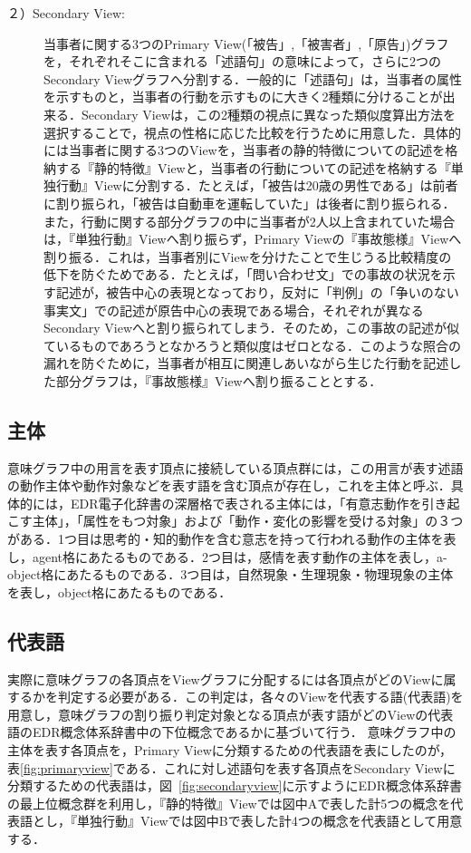 \begin{description}
\item[２）Secondary View:]当事者に関する3つのPrimary View(「被告」,「被害者」,「原告」)グラフを，それぞれそこに含まれる「述語句」の意味によって，さらに2つのSecondary Viewグラフへ分割する．一般的に「述語句」は，当事者の属性を示すものと，当事者の行動を示すものに大きく2種類に分けることが出来る．Secondary Viewは，この2種類の視点に異なった類似度算出方法を選択することで，視点の性格に応じた比較を行うために用意した．具体的には当事者に関する3つのViewを，当事者の静的特徴についての記述を格納する『静的特徴』Viewと，当事者の行動についての記述を格納する『単独行動』Viewに分割する．たとえば，「被告は20歳の男性である」は前者に割り振られ，「被告は自動車を運転していた」は後者に割り振られる．また，行動に関する部分グラフの中に当事者が2人以上含まれていた場合は，『単独行動』Viewへ割り振らず，Primary Viewの『事故態様』Viewへ割り振る．これは，当事者別にViewを分けたことで生じうる比較精度の低下を防ぐためである．たとえば，「問い合わせ文」での事故の状況を示す記述が，被告中心の表現となっており，反対に「判例」の「争いのない事実文」での記述が原告中心の表現である場合，それぞれが異なるSecondary Viewへと割り振られてしまう．そのため，この事故の記述が似ているものであろうとなかろうと類似度はゼロとなる．このような照合の漏れを防ぐために，当事者が相互に関連しあいながら生じた行動を記述した部分グラフは，『事故態様』Viewへ割り振ることとする．
\end{description}

\subsection{主体}
意味グラフ中の用言を表す頂点に接続している頂点群には，この用言が表す述語の動作主体や動作対象などを表す語を含む頂点が存在し，これを主体と呼ぶ．具体的には，EDR電子化辞書の深層格で表される主体には，「有意志動作を引き起こす主体」，「属性をもつ対象」および「動作・変化の影響を受ける対象」の３つがある．1つ目は思考的・知的動作を含む意志を持って行われる動作の主体を表し，agent格にあたるものである．2つ目は，感情を表す動作の主体を表し，a-object格にあたるものである．3つ目は，自然現象・生理現象・物理現象の主体を表し，object格にあたるものである．

\subsection{代表語}
実際に意味グラフの各頂点をViewグラフに分配するには各頂点がどのViewに属するかを判定する必要がある．この判定は，各々のViewを代表する語(代表語)を用意し，意味グラフの割り振り判定対象となる頂点が表す語がどのViewの代表語のEDR概念体系辞書中の下位概念であるかに基づいて行う．
意味グラフ中の主体を表す各頂点を，Primary Viewに分類するための代表語を表にしたのが，表\ref{fig:primaryview}である．これに対し述語句を表す各頂点をSecondary Viewに分類するための代表語は，図~\ref{fig:secondaryview}に示すようにEDR概念体系辞書の最上位概念群を利用し，『静的特徴』Viewでは図中Aで表した計5つの概念を代表語とし，『単独行動』Viewでは図中Bで表した計4つの概念を代表語として用意する．

